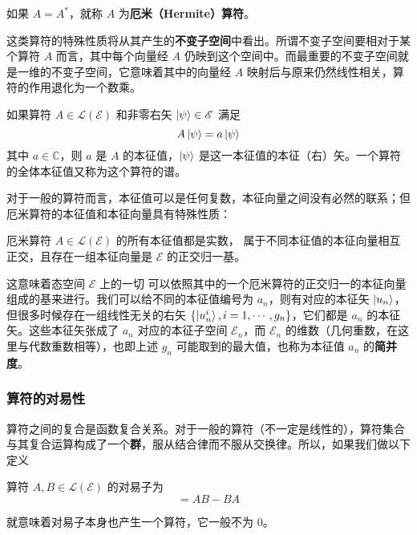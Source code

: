 \documentclass[cn,10pt,math=newtx,citestyle=gb7714-2015,bibstyle=gb7714-2015]{elegantbook}
\def\ms{\mathscr}
\def\mc{\mathcal}
\def\C{\mathbb C}
\begin{document}
\begin{definition}[厄米算符]\label{def:hermite}
如果 $A=A^*$，就称 $A$ 为\textbf{厄米（Hermite）算符}。
\end{definition}

这类算符的特殊性质将从其产生的\textbf{不变子空间}中看出。所谓不变子空间要相对于某个算符 $A$ 而言，其中每个向量经 $A$ 仍映到这个空间中。而最重要的不变子空间就是一维的不变子空间，它意味着其中的向量经 $A$ 映射后与原来仍然线性相关，算符的作用退化为一个数乘。

\begin{definition}[本征值和本征向量]\label{def:eigen}
如果算符 $A\in\mc L(\ms E)$ 和非零右矢 $\ket{\psi}\in\ms E$ 满足
\begin{equation*}
    A\ket{\psi}=a\ket{\psi}
\end{equation*}
其中 $a\in\C$，则 $a$ 是 $A$ 的本征值，$\ket{\psi}$ 是这一本征值的本征（右）矢。一个算符的全体本征值又称为这个算符的谱。
\end{definition}

对于一般的算符而言，本征值可以是任何复数，本征向量之间没有必然的联系；但厄米算符的本征值和本征向量具有特殊性质：

\begin{theorem}[谱定理]\label{thm:spectrum}
厄米算符 $A\in\mc L(\ms E)$ 的所有本征值都是实数， 属于不同本征值的本征向量相互正交，且存在一组本征向量是 $\ms E$ 的正交归一基。
\end{theorem}

这意味着态空间 $\ms E$ 上的一切 可以依照其中的一个厄米算符的正交归一的本征向量组成的基来进行。我们可以给不同的本征值编号为 $a_n$，则有对应的本征矢 $\ket{u_n}$，但很多时候存在一组线性无关的右矢 $\{\ket{u_n^i},i=1,\cdots,g_n\}$，它们都是 $a_n$ 的本征矢。这些本征矢张成了 $a_n$ 对应的本征子空间 $\ms E_n$，而 $\ms E_n$ 的维数（几何重数，在这里与代数重数相等），也即上述 $g_n$ 可能取到的最大值，也称为本征值 $a_n$ 的\textbf{简并度}。

\subsubsection{算符的对易性}
算符之间的复合是函数复合关系。对于一般的算符（不一定是线性的），算符集合与其复合运算构成了一个\textbf{群}，服从结合律而不服从交换律。所以，如果我们做以下定义
\begin{definition}[对易子]\label{def:commutator}
算符 $A,B\in\mc L(\ms E)$ 的对易子为
\begin{equation*}
    [A,B]=AB-BA
\end{equation*}
\end{definition}
就意味着对易子本身也产生一个算符，它一般不为 0。
\end{document}

